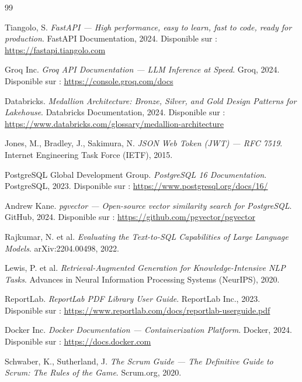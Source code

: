 \documentclass[a4paper,12pt]{report}
\begin{document}
\newpage
\begin{thebibliography}{99}

Tiangolo, S. \textit{FastAPI — High performance, easy to learn, fast to code, ready for production}. FastAPI Documentation, 2024. Disponible sur : \url{https://fastapi.tiangolo.com}

Groq Inc. \textit{Groq API Documentation — LLM Inference at Speed}. Groq, 2024. Disponible sur : \url{https://console.groq.com/docs}

Databricks. \textit{Medallion Architecture: Bronze, Silver, and Gold Design Patterns for Lakehouse}. Databricks Documentation, 2024. Disponible sur : \url{https://www.databricks.com/glossary/medallion-architecture}

Jones, M., Bradley, J., Sakimura, N. \textit{JSON Web Token (JWT) — RFC 7519}. Internet Engineering Task Force (IETF), 2015.

PostgreSQL Global Development Group. \textit{PostgreSQL 16 Documentation}. PostgreSQL, 2023. Disponible sur : \url{https://www.postgresql.org/docs/16/}

Andrew Kane. \textit{pgvector — Open-source vector similarity search for PostgreSQL}. GitHub, 2024. Disponible sur : \url{https://github.com/pgvector/pgvector}

Rajkumar, N. et al. \textit{Evaluating the Text-to-SQL Capabilities of Large Language Models}. arXiv:2204.00498, 2022.

Lewis, P. et al. \textit{Retrieval-Augmented Generation for Knowledge-Intensive NLP Tasks}. Advances in Neural Information Processing Systems (NeurIPS), 2020.

ReportLab. \textit{ReportLab PDF Library User Guide}. ReportLab Inc., 2023. Disponible sur : \url{https://www.reportlab.com/docs/reportlab-userguide.pdf}

Docker Inc. \textit{Docker Documentation — Containerization Platform}. Docker, 2024. Disponible sur : \url{https://docs.docker.com}

Schwaber, K., Sutherland, J. \textit{The Scrum Guide — The Definitive Guide to Scrum: The Rules of the Game}. Scrum.org, 2020.

\end{thebibliography}
\end{document}
